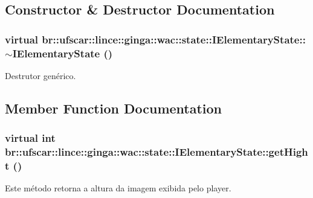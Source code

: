 \subsection{Constructor \& Destructor Documentation}
\hypertarget{classbr_1_1ufscar_1_1lince_1_1ginga_1_1wac_1_1state_1_1IElementaryState_ae16e3a178e9c9b147bc0a02b5ddaf4e6}{
\subsubsection[{$\sim$IElementaryState}]{\setlength{\rightskip}{0pt plus 5cm}virtual br::ufscar::lince::ginga::wac::state::IElementaryState::$\sim$IElementaryState ()}}
\label{classbr_1_1ufscar_1_1lince_1_1ginga_1_1wac_1_1state_1_1IElementaryState_ae16e3a178e9c9b147bc0a02b5ddaf4e6}


Destrutor genérico. 



\subsection{Member Function Documentation}
\hypertarget{classbr_1_1ufscar_1_1lince_1_1ginga_1_1wac_1_1state_1_1IElementaryState_a22990483a86a4fdb0d8203c2f96f701c}{
\subsubsection[{getHight}]{\setlength{\rightskip}{0pt plus 5cm}virtual int br::ufscar::lince::ginga::wac::state::IElementaryState::getHight ()}}
\label{classbr_1_1ufscar_1_1lince_1_1ginga_1_1wac_1_1state_1_1IElementaryState_a22990483a86a4fdb0d8203c2f96f701c}


Este método retorna a altura da imagem exibida pelo player. 

